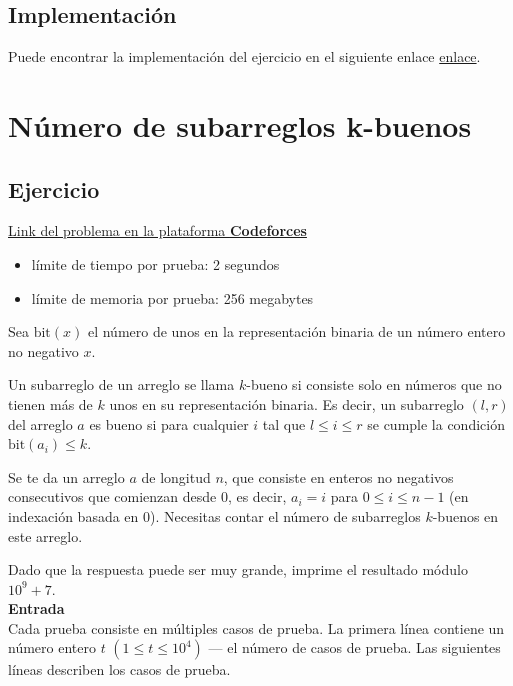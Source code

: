 \documentclass{article}
\begin{document}
\subsection{Implementación}

Puede encontrar la implementación del ejercicio en el siguiente enlace \href{https://github.com/raudel25/DAA-Project/blob/main/problems/a/a.cpp}{enlace}.

\section{Número de subarreglos k-buenos}

\subsection{Ejercicio}

\href{https://codeforces.com/problemset/problem/1982/E}{Link del problema en la plataforma \textbf{Codeforces}}

\begin{itemize}
    \item límite de tiempo por prueba: 2 segundos
    \item límite de memoria por prueba: 256 megabytes
\end{itemize}

Sea $\text{bit}(x)$ el número de unos en la representación binaria de un número entero no negativo $x$.

Un subarreglo de un arreglo se llama $k$-bueno si consiste solo en números que no tienen más de $k$ unos en su representación binaria. Es decir, un subarreglo $(l, r)$ del arreglo $a$ es bueno si para cualquier $i$ tal que $l \leq i \leq r$ se cumple la condición $\text{bit}(a_i) \leq k$.

Se te da un arreglo $a$ de longitud $n$, que consiste en enteros no negativos consecutivos que comienzan desde 0, es decir, $a_i = i$ para $0 \leq i \leq n-1$ (en indexación basada en 0). Necesitas contar el número de subarreglos $k$-buenos en este arreglo.

Dado que la respuesta puede ser muy grande, imprime el resultado módulo $10^9 + 7$.\\

\textbf{Entrada}\\

Cada prueba consiste en múltiples casos de prueba. La primera línea contiene un número entero $t$ $(1 \leq t \leq 10^4)$ — el número de casos de prueba. Las siguientes líneas describen los casos de prueba.
\end{document}
